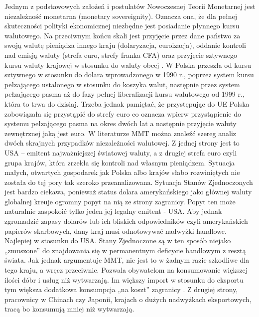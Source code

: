 \documentclass[
]{book}
\begin{document}
Jednym z podstawowych założeń i postulatów Nowoczesnej Teorii Monetarnej jest niezależność monetarna (monetary sovereignity). Oznacza ona, że dla pełnej skuteczności polityki ekonomicznej niezbędne jest posiadanie płynnego kursu walutowego. Na przeciwnym końcu skali jest przyjęcie przez dane państwo za swoją walutę pieniądza innego kraju (dolaryzacja, euroizacja), oddanie kontroli nad emisją waluty (strefa euro, strefy franka CFA) oraz przyjęcie sztywnego kursu waluty krajowej w stosunku do waluty obcej .
W Polska przeszła od kursu sztywnego w stosunku do dolara wprowadzonego w 1990 r., poprzez system kursu pełzającego ustalonego w stosunku do koszyka walut, następnie przez system pełzającego pasma aż do fazy pełnej liberalizacji kursu walutowego od 1999 r., która to trwa do dzisiaj. Trzeba jednak pamiętać, że przystępując do UE Polska zobowiązała się przystąpić do strefy euro co oznacza wpierw przystąpienie do systemu pełzającego pasma na okres dwóch lat a następnie przyjęcie waluty zewnętrznej jaką jest euro.
W literaturze MMT można znaleźć szereg analiz dwóch skrajnych przypadków niezależności walutowej. Z jednej strony jest to USA -- emitent najważniejszej światowej waluty, a z drugiej strefa euro czyli grupa krajów, która zrzekła się kontroli nad własnym pieniądzem. Sytuacja małych, otwartych gospodarek jak Polska albo krajów słabo rozwiniętych nie została do tej pory tak szeroko przeanalizowana.
Sytuacja Stanów Zjednoczonych jest bardzo ciekawa, ponieważ status dolara amerykańskiego jako głównej waluty globalnej kreuje ogromny popyt na nią ze strony zagranicy. Popyt ten może naturalnie zaspokoić tylko jeden jej legalny emitent - USA. Aby jednak zgromadzić zapasy dolarów lub ich bliskich odpowiedników czyli amerykańskich papierów skarbowych, dany kraj musi odnotowywać nadwyżki handlowe. Najlepiej w stosunku do USA. Stany Zjednoczone są w ten sposób niejako „zmuszone'' do znajdowania się w permanentnym deficycie handlowym z resztą świata. Jak jednak argumentuje MMT, nie jest to w żadnym razie szkodliwe dla tego kraju, a wręcz przeciwnie. Pozwala obywatelom na konsumowanie większej ilości dóbr i usług niż wytwarzają. Im większy import w stosunku do eksportu tym większa dodatkowa konsumpcja „na koszt'' zagranicy . Z drugiej strony, pracownicy w Chinach czy Japonii, krajach o dużych nadwyżkach eksportowych, tracą bo konsumują mniej niż wytwarzają.
\end{document}
